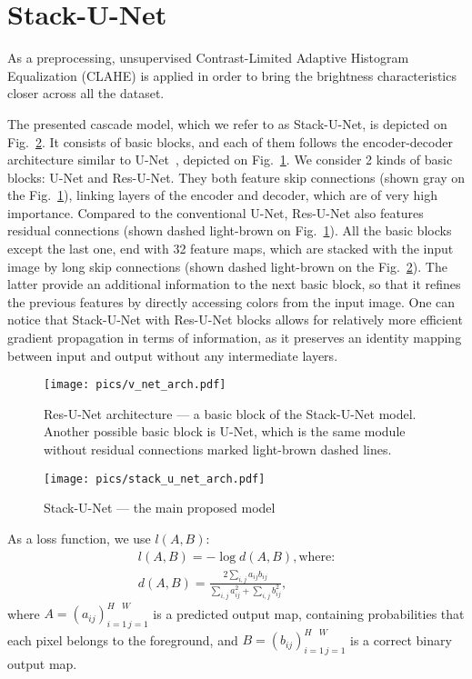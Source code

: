 \documentclass{llncs}
\begin{document}
\section{Stack-U-Net}


As a preprocessing, unsupervised Contrast-Limited Adaptive Histogram Equalization (CLAHE) \cite{szeliski2010computer} is applied in order to bring the brightness characteristics closer across all the dataset. 


The presented cascade model, which we refer to as Stack-U-Net, is depicted on Fig.~\ref{fig:stack-u-net}. It consists of basic blocks, and each of them follows the encoder-decoder architecture similar to U-Net~\cite{ronneberger2015u}, depicted on Fig.~\ref{fig:basic_block}. We consider 2 kinds of basic blocks: U-Net and Res-U-Net. They both feature skip connections (shown gray on the Fig.~\ref{fig:basic_block}), linking layers of the encoder and decoder, which are of very high importance. Compared to the conventional U-Net, Res-U-Net also features residual connections (shown dashed light-brown on Fig.~\ref{fig:basic_block}). All the basic blocks except the last one, end with 32 feature maps, which are stacked with the input image by long skip connections (shown dashed light-brown on the Fig.~\ref{fig:stack-u-net}). The latter provide an additional information to the next basic block, so that it refines the previous features by directly accessing colors from the input image.  One can notice that Stack-U-Net with Res-U-Net blocks allows for relatively more efficient gradient propagation in terms of information, as it preserves an identity mapping \cite{he2016identity,lin2017refinenet} between input and output without any intermediate layers. 


\begin{figure}[ht!]
	\centering
    \texttt{[image: pics/v\_net\_arch.pdf]}
    \caption{Res-U-Net architecture --- a basic block of the Stack-U-Net model. Another possible basic block is U-Net, which is the same module without residual connections marked light-brown dashed lines.}
    \label{fig:basic_block}
\end{figure}


\begin{figure}[ht!]
	\centering
    \texttt{[image: pics/stack\_u\_net\_arch.pdf]}
    \caption{Stack-U-Net --- the main proposed model}
    \label{fig:stack-u-net}
\end{figure}
  As a loss function, we use $l(A, B)$:
	\begin{gather*}
	l(A, B) = -\log d(A, B), \text{where:}\\
	d(A, B) = \frac{2\sum\limits_{i, j} a_{ij} b_{ij}}
	{\sum\limits_{i, j} a_{ij}^2 + \sum\limits_{i, j} b_{ij}^2},
	\end{gather*}
	where $A = (a_{ij})_{i=1\, j=1}^{H\;\;\;W}$ is a predicted output map, containing probabilities that each pixel belongs to the foreground, and $B = (b_{ij})_{i=1\, j=1}^{H\;\;\;W}$ is a correct binary output map. 
	
\end{document}
